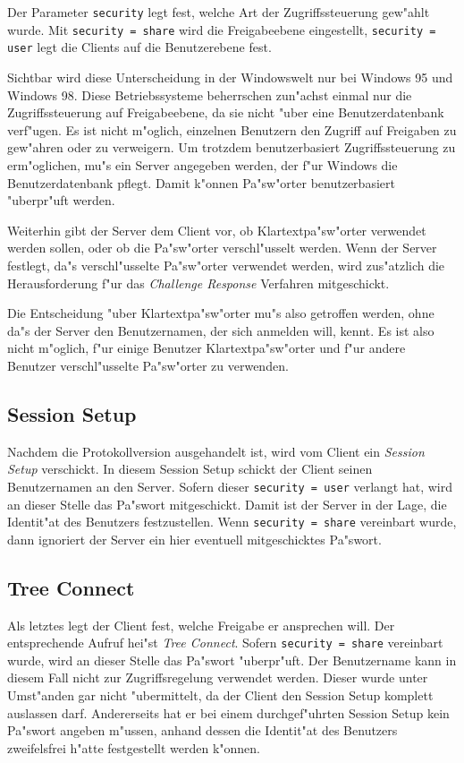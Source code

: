 \documentclass{scrartcl}\usepackage{pslatex}\typearea{12}
\newcommand{\param}{\texttt}
\newcommand{\defin}{\emph}
\begin{document}
Der Parameter \param{security} legt fest, welche Art der
Zugriffssteuerung gew"ahlt wurde.  Mit \param{security = share} wird
die Freigabeebene eingestellt, \param{security = user} legt die
Clients auf die Benutzerebene fest.

Sichtbar wird diese Unterscheidung in der Windowswelt nur bei Windows
95 und Windows 98. Diese Betriebssysteme beherrschen zun"achst einmal
nur die Zugriffssteuerung auf Freigabeebene, da sie nicht "uber eine
Benutzerdatenbank verf"ugen.  Es ist nicht m"oglich, einzelnen
Benutzern den Zugriff auf Freigaben zu gew"ahren oder zu
verweigern. Um trotzdem benutzerbasiert Zugriffssteuerung zu
erm"oglichen, mu"s ein Server angegeben werden, der f"ur Windows die
Benutzerdatenbank pflegt. Damit k"onnen Pa"sw"orter benutzerbasiert
"uberpr"uft werden.

Weiterhin gibt der Server dem Client vor, ob Klartextpa"sw"orter
verwendet werden sollen, oder ob die Pa"sw"orter verschl"usselt
werden. Wenn der Server festlegt, da"s verschl"usselte Pa"sw"orter
verwendet werden, wird zus"atzlich die Herausforderung f"ur das
\defin{Challenge Response} Verfahren mitgeschickt.

Die Entscheidung "uber Klartextpa"sw"orter mu"s also getroffen werden,
ohne da"s der Server den Benutzernamen, der sich anmelden will,
kennt. Es ist also nicht m"oglich, f"ur einige Benutzer
Klartextpa"sw"orter und f"ur andere Benutzer verschl"usselte
Pa"sw"orter zu verwenden.

\subsection{Session Setup}

Nachdem die Protokollversion ausgehandelt ist, wird vom Client ein
\defin{Session Setup} verschickt. In diesem Session Setup schickt der
Client seinen Benutzernamen an den Server. Sofern dieser
\param{security = user} verlangt hat, wird an dieser Stelle das
Pa"swort mitgeschickt. Damit ist der Server in der Lage, die
Identit"at des Benutzers festzustellen. Wenn \param{security = share}
vereinbart wurde, dann ignoriert der Server ein hier eventuell
mitgeschicktes Pa"swort.

\subsection{Tree Connect}

Als letztes legt der Client fest, welche Freigabe er ansprechen will.
Der entsprechende Aufruf hei"st \defin{Tree Connect}. Sofern
\param{security = share} vereinbart wurde, wird an dieser Stelle das
Pa"swort "uberpr"uft. Der Benutzername kann in diesem Fall nicht zur
Zugriffsregelung verwendet werden. Dieser wurde unter Umst"anden gar
nicht "ubermittelt, da der Client den Session Setup komplett auslassen
darf. Andererseits hat er bei einem durchgef"uhrten Session Setup kein
Pa"swort angeben m"ussen, anhand dessen die Identit"at des Benutzers
zweifelsfrei h"atte festgestellt werden k"onnen.
\end{document}
